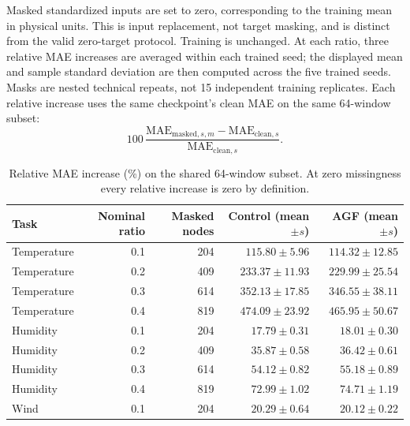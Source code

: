 \documentclass[10pt,a4paper]{article}
\begin{document}
Masked standardized inputs are set to zero, corresponding to the training mean in physical units. This is input replacement, not target masking, and is distinct from the valid zero-target protocol. Training is unchanged. At each ratio, three relative MAE increases are averaged within each trained seed; the displayed mean and sample standard deviation are then computed across the five trained seeds. Masks are nested technical repeats, not 15 independent training replicates. Each relative increase uses the same checkpoint's clean MAE on the same 64-window subset:
\[
100\,\frac{\mathrm{MAE}_{\mathrm{masked},s,m}-\mathrm{MAE}_{\mathrm{clean},s}}{\mathrm{MAE}_{\mathrm{clean},s}}.
\]

\begin{table}[H]\centering\small\setlength{\tabcolsep}{5pt}\setlength{\parskip}{0pt}

\caption{Relative MAE increase (\%) on the shared 64-window subset. At zero missingness every relative increase is zero by definition.}\label{tab:missing}

\begin{tabular}{lrrrr}

\toprule
Task & Nominal ratio & Masked nodes & Control (mean $\pm s$) & AGF (mean $\pm s$) \\
\midrule

Temperature & 0.1 & 204 & $115.80 \pm 5.96$ & $114.32 \pm 12.85$ \\

Temperature & 0.2 & 409 & $233.37 \pm 11.93$ & $229.99 \pm 25.54$ \\

Temperature & 0.3 & 614 & $352.13 \pm 17.85$ & $346.55 \pm 38.11$ \\

Temperature & 0.4 & 819 & $474.09 \pm 23.92$ & $465.95 \pm 50.67$ \\

Humidity & 0.1 & 204 & $17.79 \pm 0.31$ & $18.01 \pm 0.30$ \\

Humidity & 0.2 & 409 & $35.87 \pm 0.58$ & $36.42 \pm 0.61$ \\

Humidity & 0.3 & 614 & $54.12 \pm 0.82$ & $55.18 \pm 0.89$ \\

Humidity & 0.4 & 819 & $72.99 \pm 1.02$ & $74.71 \pm 1.19$ \\

Wind & 0.1 & 204 & $20.29 \pm 0.64$ & $20.12 \pm 0.22$ \\


\end{tabular}
\end{table}
\end{document}
